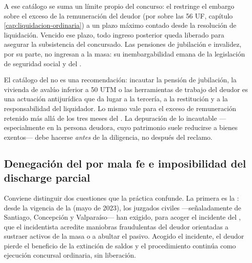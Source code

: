 A ese catálogo se suma un límite  propio del concurso: el  restringe el
embargo sobre el exceso de la remuneración del deudor (por sobre las 56 UF, capítulo
\ref{cap:liquidacion-ordinaria}) a un plazo máximo  contado
desde la resolución de liquidación. Vencido ese plazo, todo ingreso posterior queda liberado para
asegurar la subsistencia del concursado. Las pensiones de jubilación e invalidez, por su parte, no
ingresan a la masa: su inembargabilidad emana de la legislación de seguridad social y del
 .

\begin{alerta}
El catálogo del  no es una recomendación: incautar la pensión de jubilación, la
vivienda de avalúo inferior a 50 UTM o las herramientas de trabajo del deudor es una actuación
antijurídica que da lugar a la tercería, a la restitución y a la responsabilidad del liquidador. Lo
mismo vale para el exceso de remuneración retenido más allá de los tres meses del . La
depuración de lo incautable ---especialmente en la persona deudora, cuyo patrimonio suele reducirse
a bienes exentos--- debe hacerse \emph{antes} de la diligencia, no después del reclamo.
\end{alerta}

\bloqueJurisprudencial

\subsection{Denegación del \discharge{} por mala fe e imposibilidad del discharge parcial}

Conviene distinguir dos cuestiones que la práctica confunde. La primera es la
: desde la vigencia de la \Lreforma{} (mayo de 2023), los juzgados
civiles ---señaladamente de Santiago, Concepción y Valparaíso--- han exigido, para acoger el
incidente del , que el incidentista acredite  maniobras
fraudulentas del deudor orientadas a sustraer activos de la masa o a abultar el pasivo. Acogido el
incidente, el deudor pierde el beneficio de la extinción de saldos y el procedimiento continúa como
ejecución concursal ordinaria, sin liberación.

